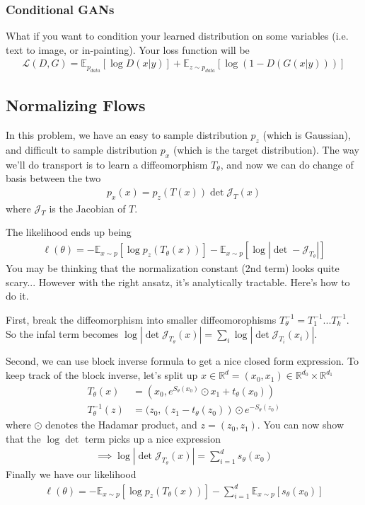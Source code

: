 \subsubsection{Conditional GANs} What if you want to condition your learned distribution on some variables (i.e. text to image, or in-painting). Your loss function will be
\begin{align}
	\mathcal L(D,G) = \mathbb E_{p_{data}} [\log D(x | y)] + \mathbb E_{z \sim p_{data}} [\log (1 - D(G(x|y)))]
\end{align}

\subsection{Normalizing Flows}
In this problem, we have an easy to sample distribution $p_z$ (which is Gaussian), and difficult to sample distribution $p_x$ (which is the target distribution). The way we'll do transport is to learn a diffeomorphism $T_\theta$, and now we can do change of basis between the two
\begin{align}
	p_x(x) = p_z(T(x)) \det \mathcal J_{T}(x) 
\end{align}
where $\mathcal J_{T}$ is the Jacobian of $T$.

The likelihood ends up being
\begin{align}
	\ell(\theta) = - \mathbb E_{x \sim p} [\log p_z(T_\theta(x))] - \mathbb E_{x \sim p}[\log |\det - \mathcal J_{T_\theta}| ]
\end{align}
You may be thinking that the normalization constant (2nd term) looks quite scary... However with the right ansatz, it's analytically tractable. Here's how to do it.

First, break the diffeomorphism into smaller diffeomorophisms $T^{-1}_\theta = T_1^{-1} ... T_k^{-1}$. So the infal term becomes $\log |\det \mathcal J_{T_\theta}(x)| = \sum_i \log |\det \mathcal J_{T_i}(x_i)|$. 

Second, we can use block inverse formula to get a nice closed form expression. To keep track of the block inverse, let's split up $x \in \mathbb R^d = (x_0, x_1) \in \mathbb R^{d_0} \times \mathbb R^{d_1}$ 
\begin{align}
	T_\theta(x) & = (x_0, e^{S_\theta(x_0)} \odot x_1 + t_\theta(x_0))\\
	T_\theta^{-1}(z) & = (z_0, (z_1 - t_\theta(z_0)) \odot e^{-S_\theta (z_0)}
\end{align}
where $\odot$ denotes the Hadamar product, and $z = (z_0,z_1)$. You can now show that the $\log \det$ term picks up a nice expression
\begin{align}
	\implies \log |\det \mathcal{J}_{T_\theta}(x)| = \sum_{i=1}^d s_\theta(x_0)
\end{align}
Finally we have our likelihood
\begin{align}
	\ell(\theta) = - \mathbb E_{x \sim p} [\log p_z(T_\theta(x))] - \sum_{i=1}^d \mathbb E_{x \sim p}[ s_\theta(x_0)]
\end{align}

